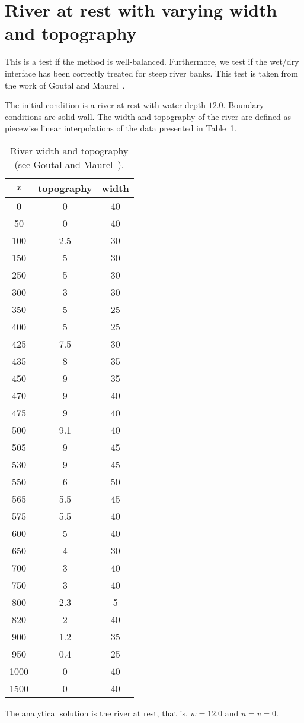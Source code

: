 
\section{River at rest with varying width and topography}

This is a test if the method is well-balanced. Furthermore, we test if the wet/dry interface has been correctly treated for steep river banks. This test is taken from the work of Goutal and Maurel~\cite{GM1997}.

The initial condition is a river at rest with water depth $12.0$. Boundary conditions are solid wall. The width and topography of the river are defined as piecewise linear interpolations of the data presented in Table~\ref{tab:width_topo}.
\begin{table}
	\centering
	\caption{River width and topography (see Goutal and Maurel~\cite{GM1997}).}
	\begin{tabular}{c|c|c}	\hline
	$x$&      topography  & width                                                       \\	\hline \hline
0 &0& 40 \\
50 &0& 40\\
100 &2.5& 30\\
150 &5& 30\\
250 &5& 30\\
300 &3& 30\\
350 &5& 25\\
400 &5& 25\\
425 &7.5& 30\\
435 &8& 35\\
450 &9& 35\\
470 &9& 40\\
475 &9& 40\\
500 &9.1& 40\\
505 &9& 45\\
530 &9& 45\\
550 &6& 50\\
565 &5.5& 45\\
575 &5.5& 40\\
600 &5& 40\\
650 &4& 30\\
700 &3& 40\\
750 &3& 40\\
800 &2.3& 5\\
820 &2& 40\\
900 &1.2& 35\\
950 &0.4& 25\\
1000 &0& 40\\
1500 &0& 40 \\ \hline
	\end{tabular}
	
	\label{tab:width_topo}
\end{table} 
The analytical solution is the river at rest, that is, $w=12.0$ and $u=v=0$.

